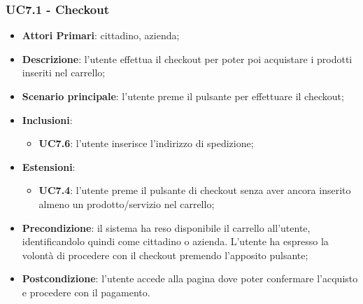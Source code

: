 \subsubsection{UC7.1 - Checkout}
\begin{itemize}
	\item \textbf{Attori Primari}: cittadino, azienda;
	\item \textbf{Descrizione}: l'utente effettua il checkout per poter poi acquistare i prodotti inseriti nel carrello;
	\item \textbf{Scenario principale}: l'utente preme il pulsante per effettuare il checkout;
	\item \textbf{Inclusioni}: 
	\begin{itemize}
		\item \textbf{UC7.6}: l'utente inserisce l'indirizzo di spedizione;
	\end{itemize}
	\item \textbf{Estensioni}: 
	\begin{itemize}
		\item \textbf{UC7.4}: l'utente preme il pulsante di checkout senza aver ancora inserito almeno un prodotto/servizio nel carrello;
	\end{itemize}
	\item \textbf{Precondizione}: il sistema ha reso disponibile il carrello all'utente, identificandolo quindi come cittadino o azienda. L'utente ha espresso la volontà di procedere con il checkout premendo l'apposito pulsante;
	\item \textbf{Postcondizione}: l'utente accede alla pagina dove poter confermare l'acquisto e procedere con il pagamento.
\end{itemize}

